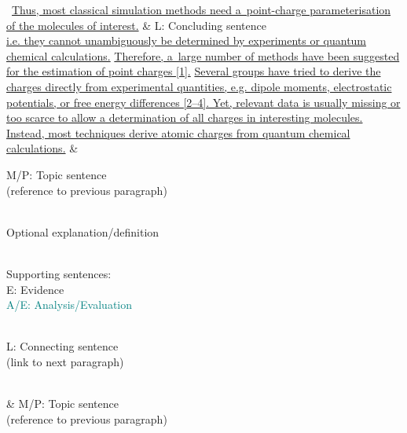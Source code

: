 \documentclass[11pt, a4paper, oneside]{article}
\newlength{\smalllinespacing}
\theoremstyle{Plain}
\theoremstyle{Definition}
\theoremstyle{Remark}
\begin{document}
\begingroup
	\begin{longtblr}{}
		\textellipsis\ {\ul{Thus, most classical simulation methods need a~point-charge parameterisation of the molecules of interest.}}
		&
		\textcolor{DarkOrchid3}{L: Concluding sentence}
		\\
		{\ul{i.e. they cannot unambiguously be determined by experiments or quantum chemical calculations.}}
		{\ul{Therefore, a~large number of methods have been suggested for the estimation of point charges [1].}}
		{\ul{Several groups have tried to derive the charges directly from experimental quantities, e.g. dipole moments, electrostatic potentials, or free energy differences [2--4]. Yet, relevant data is usually missing or too scarce to allow a determination of all charges in interesting molecules.}}
		{\ul{Instead, most techniques derive atomic charges from quantum chemical calculations.}}%
		&
		{%
			\textcolor{Purple4}{M/P: Topic sentence} \\
			\textcolor{Purple4}{\textmd{(reference to previous paragraph)}} \\
			\strut \\
			\textcolor{RoyalBlue4}{Optional explanation/definition} \\
			\strut \\
			Supporting sentences: \\
			\textcolor{DeepPink4}{E: Evidence} \\
			\textcolor{Teal}{A/E: Analysis/Evaluation} \\
			\strut \\
			\textcolor{DarkOrchid3}{L: Connecting sentence} \\
			\textcolor{DarkOrchid3}{\textmd{(link to next paragraph)}}%
		}
		\\
		 \textellipsis
		&
		{%
			\textcolor{Purple4}{M/P: Topic sentence} \\
			\textcolor{Purple4}{\textmd{(reference to previous paragraph)}}%
		}
\end{longtblr}
\endgroup
\end{document}
